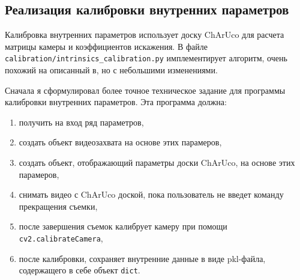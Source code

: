 \documentclass[12pt, a4paper]{article}
\begin{document}
\subsection{Реализация калибровки внутренних параметров}
\label{sec:camera_intrinsics_calibration}
Калибровка внутренних параметров использует доску ChArUco для расчета матрицы
камеры и коэффициентов искажения. В файле
\texttt{calibration/intrinsics\_calibration.py} имплементирует алгоритм, очень
похожий на описанный в\cite{opencv_calibration_tutorial}, но с небольшими
изменениями.



Сначала я сформулировал более точное техническое задание для программы калибровки внутренних параметров. 
Эта программа должна:
\begin{enumerate}
  \item получить на вход ряд параметров,
  \item создать объект видеозахвата на основе этих парамеров,
  \item создать объект, отображающий параметры доски ChArUco, на основе этих парамеров,
  \item снимать видео с ChArUco доской, пока пользователь не введет команду прекращения съемки,
  \item после завершения съемок калибрует камеру при помощи \texttt{cv2.calibrateCamera},
  \item после калибровки, сохраняет внутренние данные в виде pkl-файла, содержащего в себе объект \texttt{dict}.
\end{enumerate}
\end{document}
